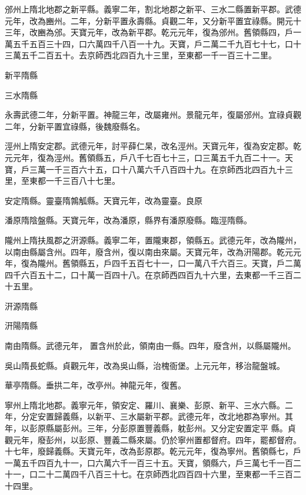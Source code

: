 \begin{pinyinscope}
 邠州上隋北地郡之新平縣。義寧二年，割北地郡之新平、三水二縣置新平郡。武德元年，改為豳州。二年，分新平置永壽縣。貞觀二年，又分新平置宜祿縣。開元十
 三年，改豳為邠。天寶元年，改為新平郡。乾元元年，復為邠州。舊領縣四，戶一萬五千五百三十四，口六萬四千八百一十九。天寶，戶二萬二千九百七十七，口十三萬五千二百五十。去京師西北四百九十三里，至東都一千一百三十二里。



 新平隋縣



 三水隋縣



 永壽武德二年，分新平置。神龍三年，改屬雍州。景龍元年，復屬邠州。宜祿貞觀二年，分新平置宜祿縣，後魏廢縣名。



 涇州上隋安定郡。武德元年，討平薛仁杲，改名涇州。天寶元年，復為安定郡。乾元元年，復為涇州。舊領縣五，戶八千七百七十三，口三萬五千九百二十一。天寶，戶三萬一千三百六十五，口十八萬六千八百四十九。在京師西北四百九十三里，至東都一千三百八十七里。



 安定隋縣。靈臺隋鶉觚縣。天寶元年，改為靈臺。良原



 潘原隋陰盤縣。天寶元年，改為潘原，縣界有潘原廢縣。臨涇隋縣。



 隴州上隋扶風郡之汧源縣。義寧二年，置隴東郡，領縣五。武德元年，改為隴州，以南由縣屬含州。四年，廢含州，復以南由來屬。天寶元年，改為汧陽郡。乾元元年，復為隴州。舊領縣五，戶四千五百七十一，口一萬八千六百三。天寶，戶二萬四千六百五十二，口十萬一百四十八。在京師西四百九十六里，去東都一千三百二十五里。



 汧源隋縣



 汧陽隋縣



 南由隋縣。武德元年，
 置含州於此，領南由一縣。四年，廢含州，以縣屬隴州。



 吳山隋長蛇縣。貞觀元年，改為吳山縣，治槐衙堡。上元元年，移治龍盤城。



 華亭隋縣。垂拱二年，改亭州。神龍元年，復舊。



 寧州上隋北地郡。義寧元年，領安定、羅川、襄樂、彭原、新平、三水六縣。二年，分定安置歸義縣，以新平、三水屬新平郡。武德元年，改北地郡為寧州。其年，以彭原縣屬彭州。三年，分彭原置豐義縣，躭彭州。又分定安置定平
 縣。貞觀元年，廢彭州，以彭原、豐義二縣來屬。仍於寧州置都督府。四年，罷都督府。十七年，廢歸義縣。天寶元年，改為彭原郡。乾元元年，復為寧州。舊領縣七，戶一萬五千四百九十一，口六萬六千一百三十五。天寶，領縣六，戶三萬七千一百二十一，口二十二萬四千八百三十七。在京師西北四百四十六里，至東都一千三百二十四里。




\end{pinyinscope}
